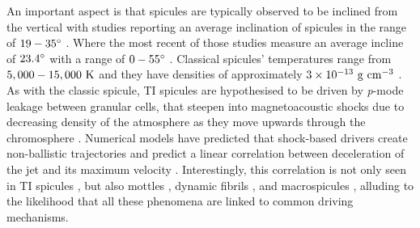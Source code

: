 %
An important aspect is that spicules are typically observed to be inclined from the vertical with studies reporting an average inclination of spicules in the range of $19-35 ^{\circ}$ \citep{Beckers1968, Mosher1977SoPh53375M, Heristchi1992SoPh14221H, Pasachoff2009SoPh26059P}. Where the most recent of those studies measure an average incline of $23.4^{\circ}$ with a range of $0-55^{\circ}$ \citep{Pasachoff2009SoPh26059P}. Classical spicules' temperatures range from $5,000-15,000~\rm{K}$ and they have densities of approximately $3\times10^{-13}~\rm{g~cm^{-3}}$ \citep{Sterling_2000SoPh}. \np 
%
As with the classic spicule, TI spicules are hypothesised to be driven by \textit{p}-mode leakage between granular cells, that steepen into magnetoacoustic shocks due to decreasing density of the atmosphere as they move upwards through the chromosphere \citep{Pontieu2004Natur, Pontieu2007PASJ, Mart2009ApJ7011569M}. Numerical models have predicted that shock-based drivers create non-ballistic trajectories and predict a linear correlation between deceleration of the jet and its maximum velocity \citep{Heggland2007ApJ6661277H}. Interestingly, this correlation is not only seen in TI spicules \citep{Pereira2012}, but also mottles \citep{Rouppe2007ApJ660L169R}, dynamic fibrils \citep{De_Pontieu2007ApJ}, and macrospicules \citep{Loboda2019ApJ871230L}, alluding to the likelihood that all these phenomena are linked to common driving mechanisms.
